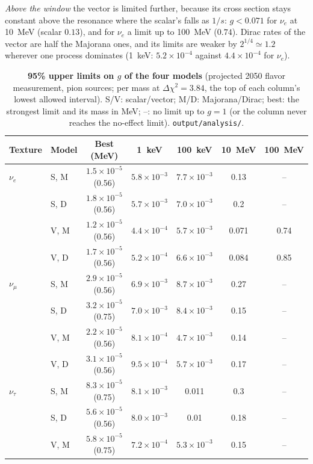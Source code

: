 \documentclass[11pt,a4paper]{article}
\newcommand{\file}[1]{\nolinkurl{#1}}
\begin{document}
\textit{Above the window} the vector is limited further, because its cross section stays constant
above the resonance where the scalar's falls as $1/s$: $g < 0.071$ for $\nu_e$ at 10~MeV (scalar
$0.13$), and for $\nu_e$ a limit up to 100~MeV ($0.74$). Dirac rates of the vector are half the Majorana ones, and its
limits are weaker by $2^{1/4}\simeq1.2$ wherever one process dominates (1~keV: $5.2\times10^{-4}$
against $4.4\times10^{-4}$ for $\nu_e$).

\begin{table}[h]
\centering
\caption{\textbf{95\% upper limits on $g$ of the four models} (projected 2050 flavor measurement,
pion sources; per mass at $\Delta\chi^2 = 3.84$, the top of each column's lowest allowed interval).
S/V: scalar/vector; M/D: Majorana/Dirac; best: the strongest limit and its mass in MeV; --: no limit
up to $g = 1$ (or the column never reaches the no-effect limit). \file{output/analysis/}.}
\label{tab:si_limits}
\small
\begin{tabular}{llccccc}
\toprule
Texture & Model & Best (MeV) & 1~keV & 100~keV & 10~MeV & 100~MeV \\
\midrule
$\nu_e$    & S, M & $1.5\times10^{-5}$ (0.56) & $5.8\times10^{-3}$ & $7.7\times10^{-3}$ & 0.13 & -- \\
           & S, D & $1.8\times10^{-5}$ (0.56) & $5.7\times10^{-3}$ & $7.0\times10^{-3}$ & 0.2 & -- \\
           & V, M & $1.2\times10^{-5}$ (0.56) & $4.4\times10^{-4}$ & $5.7\times10^{-3}$ & 0.071 & 0.74 \\
           & V, D & $1.7\times10^{-5}$ (0.56) & $5.2\times10^{-4}$ & $6.6\times10^{-3}$ & 0.084 & 0.85 \\
\midrule
$\nu_\mu$  & S, M & $2.9\times10^{-5}$ (0.56) & $6.9\times10^{-3}$ & $8.7\times10^{-3}$ & 0.27 & -- \\
           & S, D & $3.2\times10^{-5}$ (0.75) & $7.0\times10^{-3}$ & $8.4\times10^{-3}$ & 0.15 & -- \\
           & V, M & $2.2\times10^{-5}$ (0.56) & $8.1\times10^{-4}$ & $4.7\times10^{-3}$ & 0.14 & -- \\
           & V, D & $3.1\times10^{-5}$ (0.56) & $9.5\times10^{-4}$ & $5.7\times10^{-3}$ & 0.17 & -- \\
\midrule
$\nu_\tau$ & S, M & $8.3\times10^{-5}$ (0.75) & $8.1\times10^{-3}$ & 0.011 & 0.3 & -- \\
           & S, D & $5.6\times10^{-5}$ (0.56) & $8.0\times10^{-3}$ & 0.01 & 0.18 & -- \\
           & V, M & $5.8\times10^{-5}$ (0.75) & $7.2\times10^{-4}$ & $5.3\times10^{-3}$ & 0.15 & -- \\

\end{tabular}
\end{table}
\end{document}
